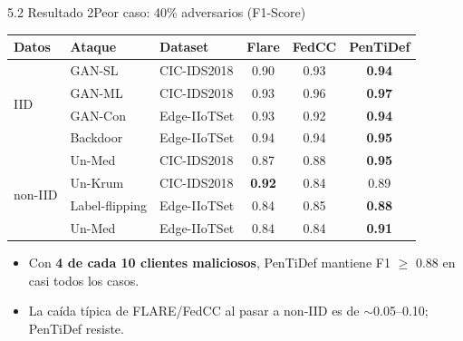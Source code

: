 \begin{frame}{5.2 Resultado 2}{Peor caso: 40\% adversarios (F1-Score)}
  \begin{center}
  \small
  \begin{tabular}{@{}lllccc@{}}
    \toprule
    \textbf{Datos} & \textbf{Ataque} & \textbf{Dataset} & \textbf{Flare} & \textbf{FedCC} & \textbf{PenTiDef} \\
    \midrule
    \multirow{4}{*}{IID}
      & GAN-SL  & CIC-IDS2018  & 0.90 & 0.93 & \textbf{0.94} \\
      & GAN-ML  & CIC-IDS2018  & 0.93 & 0.96 & \textbf{0.97} \\
      & GAN-Con & Edge-IIoTSet & 0.93 & 0.92 & \textbf{0.94} \\
      & Backdoor & Edge-IIoTSet & 0.94 & 0.94 & \textbf{0.95} \\
    \midrule
    \multirow{4}{*}{non-IID}
      & Un-Med  & CIC-IDS2018  & 0.87 & 0.88 & \textbf{0.95} \\
      & Un-Krum & CIC-IDS2018  & \textbf{0.92} & 0.84 & 0.89 \\
      & Label-flipping & Edge-IIoTSet & 0.84 & 0.85 & \textbf{0.88} \\
      & Un-Med  & Edge-IIoTSet & 0.84 & 0.84 & \textbf{0.91} \\
    \bottomrule
  \end{tabular}
  \end{center}
  \vfill
  \begin{itemize}\small
    \item Con \textbf{4 de cada 10 clientes maliciosos}, PenTiDef mantiene F1 $\geq$ 0.88 en casi todos los casos.
    \item La caída típica de FLARE/FedCC al pasar a non-IID es de $\sim$0.05--0.10; PenTiDef resiste.
  \end{itemize}
\end{frame}

